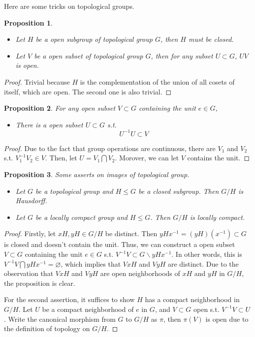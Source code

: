 \documentclass[12pt,a4paper]{article}
\newtheorem{prop}{Proposition}
\begin{document}
Here are some tricks on topological groups.
\begin{prop}
    \begin{itemize}
        \item Let $H$ be a open subgroup of topological group $G$, then $H$ must be closed.
        \item Let $V$ be a open subset of topological group $G$, then for any subset $U\subset G$, $UV$ is open.
    \end{itemize}
\end{prop}
\begin{proof}
    Trivial because $H$ is the complementation of the union of all cosets of itself, which are open. The second one is also trivial.
\end{proof}
\begin{prop}
    For any open subset $V\subset G$ containing the unit $e\in G$, 
    \begin{itemize}
        \item There is a open subset $U\subset G$ s.t. \[U^{-1}U\subset V\]
    \end{itemize}
\end{prop}
\begin{proof}
    Due to the fact that group operations are continuous, there are $V_1$ and $V_2$ s.t. $V_1^{-1}V_2\in V$. Then, let $U=V_1\bigcap V_2$. Morover, we can let $V$ contains the unit.
\end{proof}
\begin{prop}
    Some asserts on images of topological group.
    \begin{itemize}
        \item Let $G$ be a topological group and $H\leq G$ be a closed subgroup. Then $G/H$ is Hausdorff.
        \item Let $G$ be a locally compact group and $H\leq G$. Then $G/H$ is locally compact.
    \end{itemize}
\end{prop}
\begin{proof}
    Firstly, let $xH, yH\in G/H$ be distinct. Then $yHx^{-1}=(yH)(x^{-1})\subset G$ is closed and doesn't contain the unit. Thus, we can construct a open subset $V\subset G$ containing the unit $e\in G$ s.t. $V^{-1}V\subset G\backslash yHx^{-1}$. In other words, this is $V^{-1}V\bigcap yHx^{-1}=\varnothing$, which implies that $VxH$ and $VyH$ are distinct. Due to the observation that $VxH$ and $VyH$ are open neighborhoods of $xH$ and $yH$ in $G/H$, the proposition is clear.
    \par For the second assertion, it suffices to show $H$ has a compact neighborhood in $G/H$. Let $U$ be a compact neighborhood of $e$ in $G$, and $V\subset G$ open s.t. $V^{-1}V\subset U$. Write the canonical morphism from $G$ to $G/H$ as $\pi$, then $\pi(V)$ is open due to the definition of topology on $G/H$. 
\end{proof}
\end{document}
